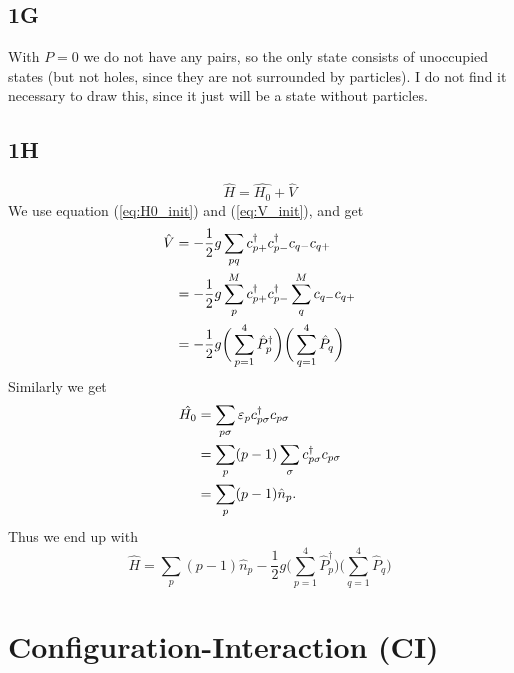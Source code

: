 \documentclass[norsk,a4paper,12pt]{article}
\begin{document}
\subsection*{1G}
With $P=0$ we do not have any pairs, so the only state consists of unoccupied states (but not holes, since they are not surrounded by particles). I do not find it necessary to draw this, since it just will be a state without particles.

\subsection*{1H}
\begin{equation*}
\hat{H}=\hat{H_0}+\hat{V}
\end{equation*}
We use equation (\ref{eq:H0_init}) and (\ref{eq:V_init}), and get
\begin{align*}
\hat{V}&=-\frac{1}{2}g\sum_{pq}c_{p+}^{\dagger}c_{p-}^{\dagger}c_{q-}c_{q+}\notag\\
&=-\frac{1}{2}g\sum_{p}^Mc_{p+}^{\dagger}c_{p-}^{\dagger}\sum_q^Mc_{q-}c_{q+}\notag\\
&=-\frac{1}{2}g\bigg(\sum_{p=1}^4\hat{P}_p^{\dagger}\bigg)\bigg(\sum_{q=1}^4\hat{P}_q\bigg)
\end{align*}
Similarly we get
\begin{align*}
\hat{H_0}&=\sum_{p\sigma}\varepsilon_pc_{p\sigma}^{\dagger}c_{p\sigma}\notag\\
&=\sum_p(p-1)\sum_{\sigma}c_{p\sigma}^{\dagger}c_{p\sigma}\notag\\
&=\sum_p(p-1)\hat{n}_p.
\end{align*}
Thus we end up with
\begin{equation}
\hat{H}=\sum_p(p-1)\hat{n}_p-\frac{1}{2}g\bigg(\sum_{p=1}^4\hat{P}_p^{\dagger}\bigg)\bigg(\sum_{q=1}^4\hat{P}_q\bigg)
\end{equation}

\newpage
\section{Configuration-Interaction (CI)}
\end{document}
